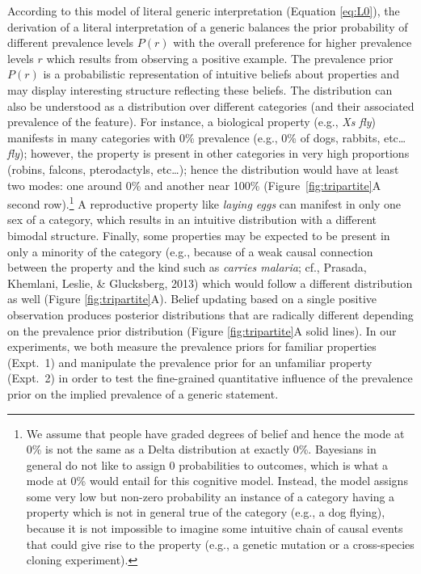 \documentclass[floatsintext,doc]{apa6}
\let\rmarkdownfootnote\footnote%
\def\footnote{\protect\rmarkdownfootnote}
\begin{document}
According to this model of literal generic interpretation (Equation \ref{eq:L0}), the derivation of a literal interpretation of a generic balances the prior probability of different prevalence levels \(P(r)\) with the overall preference for higher prevalence levels \(r\) which results from observing a positive example.
The prevalence prior \(P(r)\) is a probabilistic representation of intuitive beliefs about properties and may display interesting structure reflecting these beliefs.
The distribution can also be understood as a distribution over different categories (and their associated prevalence of the feature).
For instance, a biological property (e.g., \emph{Xs fly}) manifests in many categories with 0\% prevalence (e.g., 0\% of dogs, rabbits, etc\ldots{} \emph{fly}); however, the property is present in other categories in very high proportions (robins, falcons, pterodactyls, etc\ldots{}); hence the distribution would have at least two modes: one around 0\% and another near 100\% (Figure~\ref{fig:tripartite}A second row).\footnote{
	We assume that people have graded degrees of belief and hence the mode at 0\% is not the same as a Delta distribution at exactly 0\%. Bayesians in general do not like to assign 0 probabilities to outcomes, which is what a mode at 0\% would entail for this cognitive model. Instead, the model assigns some very low but non-zero probability an instance of a category having a property which is not in general true of the category  (e.g., a dog flying), because it is not impossible to imagine some intuitive chain of causal events that could give rise to the property (e.g., a genetic mutation or a cross-species cloning experiment). 
}
A reproductive property like \emph{laying eggs} can manifest in only one sex of a category, which results in an intuitive distribution with a different bimodal structure.  
Finally, some properties may be expected to be present in only a minority of the category (e.g., because of a weak causal connection between the property and the kind such as \emph{carries malaria}; cf., Prasada, Khemlani, Leslie, \& Glucksberg, 2013) which would follow a different distribution as well (Figure \ref{fig:tripartite}A). 
Belief updating based on a single positive observation produces posterior distributions that are radically different depending on the prevalence prior distribution  (Figure \ref{fig:tripartite}A solid lines).
In our experiments, we both measure the prevalence priors for familiar properties  (Expt.~1) and manipulate the prevalence prior for an unfamiliar property (Expt.~2) in order to test the fine-grained quantitative influence of the prevalence prior on the implied prevalence of a generic statement. 
\end{document}
